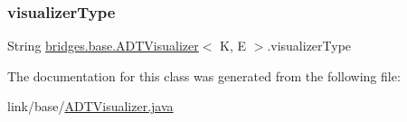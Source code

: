 \subsubsection{\texorpdfstring{visualizer\+Type}{visualizerType}}
{\footnotesize\ttfamily String \hyperlink{classbridges_1_1base_1_1_a_d_t_visualizer}{bridges.\+base.\+A\+D\+T\+Visualizer}$<$ K, E $>$.visualizer\+Type}



The documentation for this class was generated from the following file\+:\begin{DoxyCompactItemize}
\item 
link/base/\hyperlink{_a_d_t_visualizer_8java}{A\+D\+T\+Visualizer.\+java}\end{DoxyCompactItemize}
